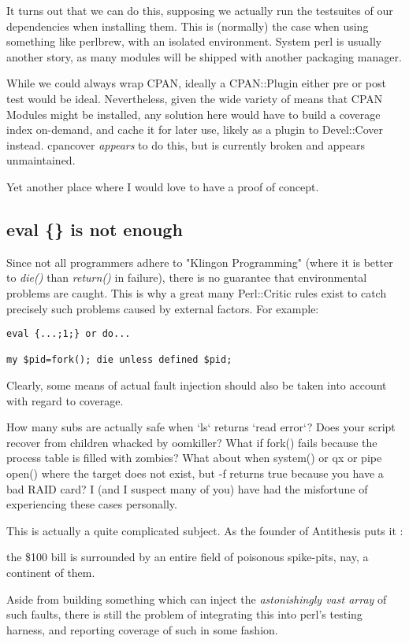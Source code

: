 \documentclass{article}
\begin{document}
It turns out that we can do this, supposing we actually run the testsuites of our dependencies when installing them.
This is (normally) the case when using something like perlbrew, with an isolated environment.
System perl is usually another story, as many modules will be shipped with another packaging manager.

While we could always wrap CPAN, ideally a CPAN::Plugin either pre or post test would be ideal.
Nevertheless, given the wide variety of means that CPAN Modules might be installed, any solution here would have to build a coverage index on-demand, and cache it for later use, likely as a plugin to Devel::Cover instead.
cpancover \textit{appears} to do this, but is currently broken and appears unmaintained.

Yet another place where I would love to have a proof of concept.

\subsection{eval \{\} is not enough}

Since not all programmers adhere to "Klingon Programming" (where it is better to \textit{die()} than \textit{return()} in failure),
there is no guarantee that environmental problems are caught.
This is why a great many Perl::Critic rules exist to catch precisely such problems caused by external factors.
For example:
\begin{lstlisting}
eval {...;1;} or do...

my $pid=fork(); die unless defined $pid;
\end{lstlisting}
Clearly, some means of actual fault injection should also be taken into account with regard to coverage.

How many subs are actually safe when `ls` returns `read error`?
Does your script recover from children whacked by oomkiller?
What if fork() fails because the process table is filled with zombies? \cite{gsb2}
What about when system() or qx{} or pipe open() where the target does not exist, but -f returns true because you have a bad RAID card?
I (and I suspect many of you) have had the misfortune of experiencing these cases personally.

This is actually a quite complicated subject.  As the founder of Antithesis puts it \cite{antithesis}:
\begin{displayquote}
the \$100 bill is surrounded by an entire field of poisonous spike-pits, nay, a continent of them.
\end{displayquote}
Aside from building something which can inject the \textit{astonishingly vast array} of such faults,
there is still the problem of integrating this into perl's testing harness, and reporting coverage of such in some fashion.
\end{document}
